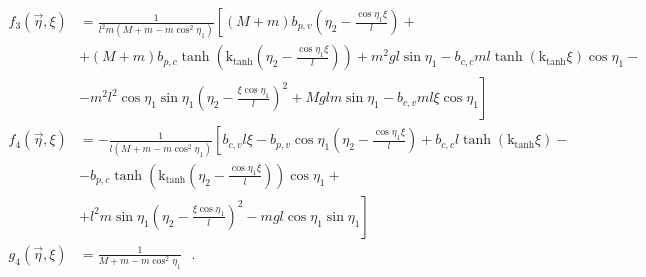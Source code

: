 \begin{align}
f_3(\vec{\eta},\xi) &= \frac{1}{ l^2 m (M + m - m \cos^2 \eta_1) }
\left[
(M + m) b_{p,v} \left(\eta_2 - \frac{\cos \eta_1 \xi}{l}\right) + \right. \nonumber \\
&+ (M + m) b_{p,c} \tanh\left(\mathrm{k}_{\mathrm{tanh}} \left(\eta_2 - \frac{ \cos \eta_1 \xi}{l}\right)\right) + m^2 g l \sin \eta_1 - b_{c,c} m l \tanh\left(\mathrm{k}_{\mathrm{tanh}} \xi\right) \cos \eta_1 - \nonumber \\
&- \left. m^2 l^2 \cos \eta_1 \sin \eta_1 \left(\eta_2 - \frac{\xi \cos \eta_1}{l}\right)^2 + M g l m \sin \eta_1 - b_{c,v} m l \xi \cos \eta_1
\right] \\
%
%
f_4(\vec{\eta},\xi) &= -\frac{1}{ l (M + m - m \cos^2 \eta_1) } \left[   b_{c,v} l \xi - b_{p,v} \cos \eta_1 \left(\eta_2 - \frac{\cos \eta_1 \xi}{l}\right) + b_{c,c} l \tanh\left(\mathrm{k}_{\mathrm{tanh}} \xi\right) - \right. \nonumber \\
&- b_{p,c} \tanh\left(\mathrm{k}_{\mathrm{tanh}} \left(\eta_2 - \frac{ \cos \eta_1 \xi}{l}\right)\right) \cos \eta_1 + \nonumber \\
&+ \left. l^2 m \sin \eta_1 \left(\eta_2 - \frac{\xi \cos \eta_1}{l}\right)^2 - m g l \cos \eta_1 \sin \eta_1  \right] \\
%
%
g_4(\vec{\eta},\xi) &= \frac{1}{M + m - m \cos^2 \eta_1 }
\ \ \ .
\label{eq:f3f4g4} \\ \nonumber
\end{align}
\endgroup \vspace{-44pt}

